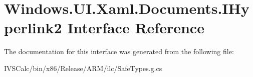 \hypertarget{interface_windows_1_1_u_i_1_1_xaml_1_1_documents_1_1_i_hyperlink2}{}\section{Windows.\+U\+I.\+Xaml.\+Documents.\+I\+Hyperlink2 Interface Reference}
\label{interface_windows_1_1_u_i_1_1_xaml_1_1_documents_1_1_i_hyperlink2}


The documentation for this interface was generated from the following file\+:\begin{DoxyCompactItemize}
\item 
I\+V\+S\+Calc/bin/x86/\+Release/\+A\+R\+M/ilc/Safe\+Types.\+g.\+cs\end{DoxyCompactItemize}
